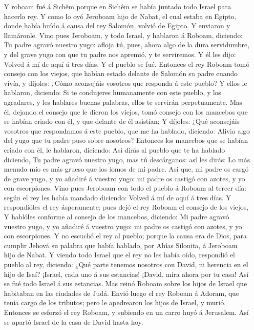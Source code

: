  Y roboam fué á Sichêm porque en Sichêm se había juntado
todo Israel para hacerlo rey.  Y como lo oyó Jeroboam hijo
de Nabat, el cual estaba en Egipto, donde había huído á causa del rey
Salomón, volvió de Egipto.  Y enviaron y llamáronle. Vino
pues Jeroboam, y todo Israel, y hablaron á Roboam, diciendo:
 Tu padre agravó nuestro yugo: afloja tú, pues, ahora algo
de la dura servidumbre, y del grave yugo con que tu padre nos apremió, y
te serviremos.  Y él les dijo: Volved á mí de aquí á tres
días. Y el pueblo se fué.  Entonces el rey Roboam tomó
consejo con los viejos, que habían estado delante de Salomón su padre
cuando vivía, y díjoles: ¿Cómo aconsejáis vosotros que responda á este
pueblo?  Y ellos le hablaron, diciendo: Si te condujeres
humanamente con este pueblo, y los agradares, y les hablares buenas
palabras, ellos te servirán perpetuamente.  Mas él, dejando
el consejo que le dieron los viejos, tomó consejo con los mancebos que
se habían criado con él, y que delante de él asistían;  Y
díjoles: ¿Qué aconsejáis vosotros que respondamos á este pueblo, que me
ha hablado, diciendo: Alivia algo del yugo que tu padre puso sobre
nosotros?  Entonces los mancebos que se habían criado con
él, le hablaron, diciendo: Así dirás al pueblo que te ha hablado
diciendo, Tu padre agravó nuestro yugo, mas tú descárganos: así les
dirás: Lo más menudo mío es más grueso que los lomos de mi padre.
 Así que, mi padre os cargó de grave yugo, y yo añadiré á
vuestro yugo: mi padre os castigó con azotes, y yo con escorpiones.
 Vino pues Jeroboam con todo el pueblo á Roboam al tercer
día: según el rey les había mandado diciendo: Volved á mí de aquí á tres
días.  Y respondióles el rey ásperamente; pues dejó el rey
Roboam el consejo de los viejos,  Y hablóles conforme al
consejo de los mancebos, diciendo: Mi padre agravó vuestro yugo, y yo
añadiré á vuestro yugo: mi padre os castigó con azotes, y yo con
escorpiones.  Y no escuchó el rey al pueblo; porque la
causa era de Dios, para cumplir Jehová su palabra que había hablado, por
Ahías Silonita, á Jeroboam hijo de Nabat.  Y viendo todo
Israel que el rey no les había oído, respondió el pueblo al rey,
diciendo: ¿Qué parte tenemos nosotros con David, ni herencia en el hijo
de Isaí? ¡Israel, cada uno á sus estancias! ¡David, mira ahora por tu
casa! Así se fué todo Israel á sus estancias.  Mas reinó
Roboam sobre los hijos de Israel que habitaban en las ciudades de Judá.
 Envió luego el rey Roboam á Adoram, que tenía cargo de los
tributos; pero le apedrearon los hijos de Israel, y murió. Entonces se
esforzó el rey Roboam, y subiendo en un carro huyó á Jerusalem.
 Así se apartó Israel de la casa de David hasta hoy.

